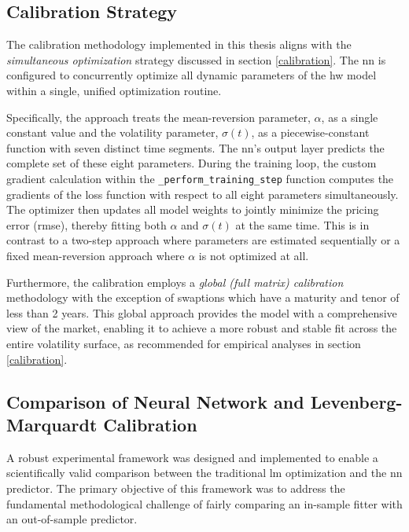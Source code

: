 \subsection{Calibration Strategy}
The calibration methodology implemented in this thesis aligns with the \textit{simultaneous optimization} strategy discussed in section \ref{calibration}. The \ac{nn} is configured to concurrently optimize all dynamic parameters of the \ac{hw} model within a single, unified optimization routine.

Specifically, the approach treats the mean-reversion parameter, $\alpha$, as a single constant value and the volatility parameter, $\sigma(t)$, as a piecewise-constant function with seven distinct time segments. The \ac{nn}'s output layer predicts the complete set of these eight parameters. During the training loop, the custom gradient calculation within the \texttt{\_perform\_training\_step} function computes the gradients of the loss function with respect to all eight parameters simultaneously. The optimizer then updates all model weights to jointly minimize the pricing error (\ac{rmse}), thereby fitting both $\alpha$ and $\sigma(t)$ at the same time. This is in contrast to a two-step approach where parameters are estimated sequentially or a fixed mean-reversion approach where $\alpha$ is not optimized at all.

Furthermore, the calibration employs a \textit{global (full matrix) calibration} methodology with the exception of swaptions which have a maturity and tenor of less than 2 years. This global approach provides the model with a comprehensive view of the market, enabling it to achieve a more robust and stable fit across the entire volatility surface, as recommended for empirical analyses in section \ref{calibration}.

\subsection{Comparison of Neural Network and Levenberg-Marquardt Calibration}
\label{subsec:comparison_of_nn_and_lm}
A robust experimental framework was designed and implemented to enable a scientifically valid comparison between the traditional \ac{lm} optimization and the \ac{nn} predictor. The primary objective of this framework was to address the fundamental methodological challenge of fairly comparing an in-sample fitter with an out-of-sample predictor.


